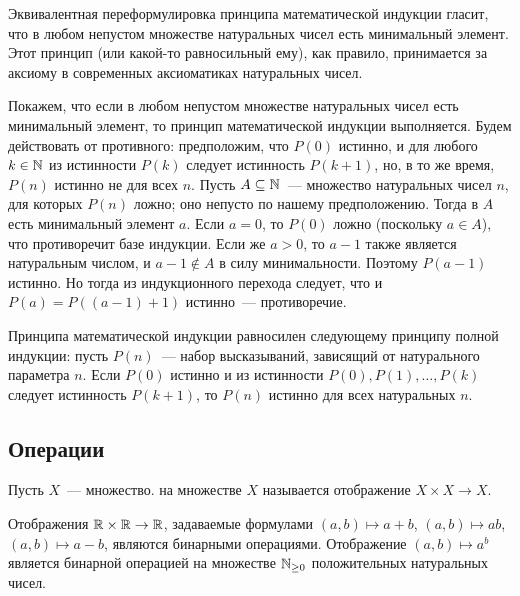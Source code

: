 Эквивалентная переформулировка принципа математической индукции
гласит, что в любом непустом множестве натуральных чисел есть
минимальный элемент. Этот принцип (или какой-то равносильный ему), как
правило, принимается за аксиому в современных аксиоматиках натуральных
чисел.

Покажем, что если в любом непустом множестве натуральных чисел есть
минимальный элемент, то принцип математической индукции
выполняется. Будем действовать от противного: предположим, что $P(0)$
истинно, и для любого $k\in\mathbb N$ из истинности $P(k)$ следует
истинность $P(k+1)$, но, в то же время, $P(n)$ истинно не для всех
$n$. Пусть $A\subseteq\mathbb N$~--- множество натуральных чисел $n$, для
которых $P(n)$ ложно; оно непусто по нашему предположению.
Тогда в $A$ есть минимальный элемент $a$. Если $a=0$, то $P(0)$ ложно
(поскольку $a\in A$), что противоречит базе индукции. Если же $a>0$,
то $a-1$ также является натуральным числом, и $a-1\notin A$ в силу
минимальности. Поэтому $P(a-1)$ истинно. Но тогда из индукционного
перехода следует, что и $P(a) = P((a-1)+1)$ истинно~--- противоречие.

Принципа математической индукции равносилен следующему
принципу полной индукции: пусть
$P(n)$~--- набор высказываний, зависящий от натурального параметра
$n$. Если $P(0)$ истинно и из истинности $P(0), P(1),\dots,P(k)$
следует истинность $P(k+1)$, то $P(n)$ истинно для всех натуральных $n$.

\subsection{Операции}


\begin{definition}
Пусть $X$~--- множество.  на множестве $X$
называется отображение $X\times X\to X$.
\end{definition}

\begin{examples}
Отображения $\mathbb R\times\mathbb R\to\mathbb R$, задаваемые формулами
$(a,b)\mapsto a+b$, $(a,b)\mapsto ab$, $(a,b)\mapsto a-b$, являются
бинарными операциями. Отображение $(a,b)\mapsto a^b$ является бинарной
операцией на множестве $\mathbb N_{\geq 0}$ положительных натуральных чисел.
\end{examples}

